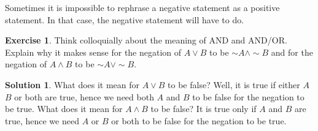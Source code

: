 \documentclass[a4paper, 11pt]{report}
\theoremstyle{plain}
\theoremstyle{definition}
\newtheorem{exrc}[thm]{Exercise}
\newtheorem*{sltn}{Solution}
\renewcommand{\neg}{{\sim}} %
\begin{document}
  Sometimes it is impossible to rephrase a negative statement as a positive
  statement. In that case, the negative statement will have to do.

  \begin{exrc}
    Think colloquially about the meaning of AND and AND/OR. Explain why it
    makes sense for the negation of $A \lor B$ to be $\neg A \land \neg B$ and
    for the negation of $A \land B$ to be $\neg A \lor \neg B$.
  \end{exrc}
  \begin{sltn}
    What does it mean for $A \lor B$ to be false? Well, it is true if either
    $A$  $B$ or both are true, hence we need both $A$ and $B$ to be false for
    the negation to be true. 
    What does it mean for $A \land B$ to be false? It is true only if $A$ and
    $B$ are true, hence we need $A$ or $B$ or both to be false for the negation
    to be true.
  \end{sltn}

\printindex
\end{document}
